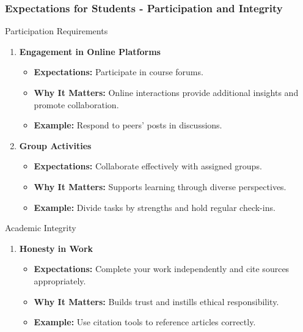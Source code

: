 \documentclass[aspectratio=169]{beamer}
\begin{document}
\begin{frame}[fragile]
    \frametitle{Expectations for Students - Participation and Integrity}
    \begin{block}{Participation Requirements}
        \begin{enumerate}
            \item \textbf{Engagement in Online Platforms}
            \begin{itemize}
                \item \textbf{Expectations:} Participate in course forums.
                \item \textbf{Why It Matters:} Online interactions provide additional insights and promote collaboration.
                \item \textbf{Example:} Respond to peers' posts in discussions.
            \end{itemize}

            \item \textbf{Group Activities}
            \begin{itemize}
                \item \textbf{Expectations:} Collaborate effectively with assigned groups.
                \item \textbf{Why It Matters:} Supports learning through diverse perspectives.
                \item \textbf{Example:} Divide tasks by strengths and hold regular check-ins.
            \end{itemize}
        \end{enumerate}
    \end{block}

    \begin{block}{Academic Integrity}
        \begin{enumerate}
            \item \textbf{Honesty in Work}
            \begin{itemize}
                \item \textbf{Expectations:} Complete your work independently and cite sources appropriately.
                \item \textbf{Why It Matters:} Builds trust and instills ethical responsibility.
                \item \textbf{Example:} Use citation tools to reference articles correctly.
            \end{itemize}


\end{enumerate}
\end{block}
\end{frame}
\end{document}
